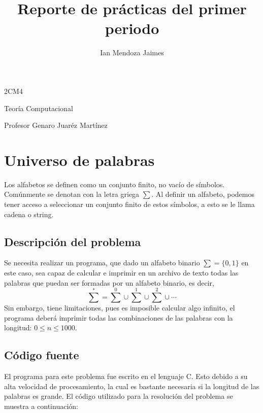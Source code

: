 \documentclass[12pt]{article}
\title{Reporte de prácticas del primer periodo}
\author{Ian Mendoza Jaimes}
\date{}
\begin{document}
\maketitle

\begin{center}
\large
2CM4

Teoría Computacional

Profesor Genaro Juaréz Martínez
\end{center}

\newpage

\tableofcontents

\newpage


\section{Universo de palabras}
Los alfabetos se definen como un conjunto finito, no vacío de símbolos. Comúnmente se denotan con la letra griega $\sum$. Al definir un alfabeto, podemos tener acceso a seleccionar un conjunto finito de estos símbolos, a esto se le llama cadena o string. \cite{automatas}

\subsection{Descripción del problema}
Se necesita realizar un programa, que dado un alfabeto binario $\sum = \lbrace 0, 1 \rbrace $ en este caso, sea  capaz  de calcular e imprimir en un archivo de texto todas las palabras que puedan ser formadas por un alfabeto binario, es decir, \[{\sum}^{*} = {\sum}^{0}\cup{\sum}^{1}\cup{\sum}^{2}\cup\cdots\] Sin embargo, tiene limitaciones, pues es imposible calcular algo infinito, el programa deberá imprimir todas las combinaciones de las palabras con la longitud: $0 \leq n \leq 1000$.

\subsection{Código fuente}
El programa para este problema fue escrito en el lenguaje C. Esto debido a su alta velocidad de procesamiento, la cual es bastante necesaria si la longitud de las palabras es grande. El código utilizado para la resolución del problema se muestra a continuación:\\
\end{document}
